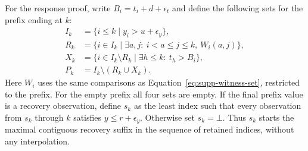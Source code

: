 For the response proof, write $B_i=t_i+d+\epsilon_t$ and define the following sets for the prefix ending at $k$:
\begin{equation}
\begin{aligned}
I_k&=\{i\leq k\mid y_i>u+\epsilon_y\},\\
R_k&=\{i\in I_k\mid\exists a,j:\ i<a\leq j\leq k,\ W_i(a,j)\},\\
X_k&=\{i\in I_k\setminus R_k\mid\exists h\leq k:\ t_h>B_i\},\\
P_k&=I_k\setminus(R_k\cup X_k).
\end{aligned}
\label{eq:proof-prefix-partition}
\end{equation}
Here $W_i$ uses the same comparisons as Equation~\eqref{eq:supp-witness-set}, restricted to the prefix. For the empty prefix all four sets are empty. If the final prefix value is a recovery observation, define $s_k$ as the least index such that every observation from $s_k$ through $k$ satisfies $y\leq r+\epsilon_y$. Otherwise set $s_k=\bot$. Thus $s_k$ starts the maximal contiguous recovery suffix in the sequence of retained indices, without any interpolation.

